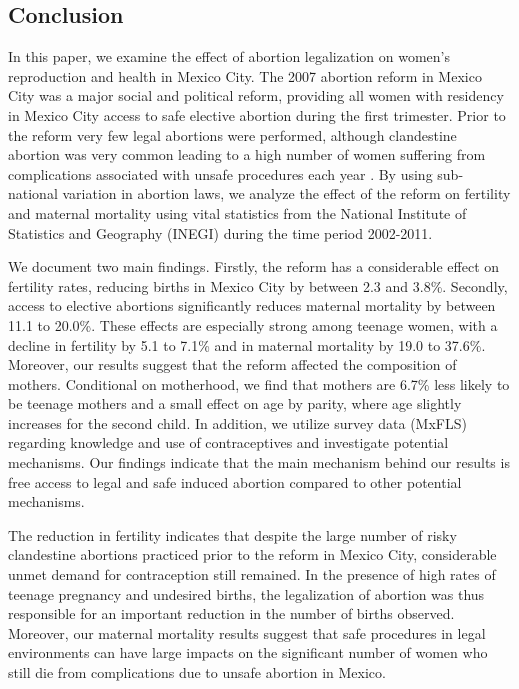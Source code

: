 \documentclass[a4paper, 11pt]{article}
\begin{document}
\begin{spacing}{2}
 
\section{Conclusion}\label{Conclusion}
In this paper, we examine the effect of abortion legalization on women's reproduction and health in Mexico City. The 2007 abortion reform in Mexico City was a major social and political reform, providing all women with residency in Mexico City access to safe elective abortion during the first trimester. Prior to the reform very few legal abortions were performed, although clandestine abortion was very common \citep{Becker2013} leading to a high number of women suffering from complications associated with unsafe procedures each year \citep{GIRE2009}. By using sub-national variation in abortion laws, we analyze the effect of the reform on fertility and maternal mortality using vital statistics from the National Institute of Statistics and Geography (INEGI) during the time period 2002-2011. 

We document two main findings. Firstly, the reform has a considerable effect on fertility rates, reducing births in Mexico City by between 2.3 and 3.8\%. Secondly, access to elective abortions significantly reduces maternal mortality by between 11.1 to 20.0\%. These effects are especially strong among teenage women, with a decline in fertility by 5.1 to 7.1\% and in maternal mortality by 19.0 to 37.6\%. Moreover, our results suggest that the reform affected the composition of mothers. Conditional on motherhood, we find that mothers are 6.7\% less likely to be teenage mothers and a small effect on age by parity, where age slightly increases for the second child. In addition, we utilize survey data (MxFLS) regarding knowledge and use of contraceptives and investigate potential mechanisms. Our findings indicate that the main mechanism behind our results is free access to legal and safe induced abortion compared to other potential mechanisms.
 
The reduction in fertility indicates that despite the large number of risky clandestine abortions practiced prior to the reform in Mexico City, considerable unmet demand for contraception still remained. In the presence of high rates of teenage pregnancy and undesired births, the legalization of abortion was thus responsible for an important reduction in the number of births observed. Moreover, our maternal mortality results suggest that safe procedures in legal environments can have large impacts on the significant number of women who still die from complications due to unsafe abortion in Mexico. 


\end{spacing}
\end{document}
